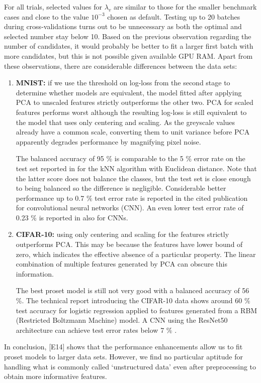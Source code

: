 %
For all trials, selected values for $\lambda_v$ are similar to those for the smaller benchmark cases and close to the value $10^{-3}$ chosen as default.
Testing up to 20 batches during cross-validations turns out to be unnecessary as both the optimal and selected number stay below 10.
Based on the previous observation regarding the number of candidates, it would probably be better to fit a larger first batch with more candidates, but this is not possible given available GPU RAM.
Apart from these observations, there are considerable differences between the data sets:
%
\begin{enumerate}
\item\textbf{MNIST:} if we use the threshold on log-loss from the second stage to determine whether models are equivalent, the model fitted after applying PCA to unscaled features strictly outperforms the other two.
PCA for scaled features performs worst although the resulting log-loss is still equivalent to the model that uses only centering and scaling.
As the greyscale values already have a common scale, converting them to unit variance before PCA apparently degrades performance by magnifying pixel noise.\par
%
The balanced accuracy of 95 \% is comparable to the 5 \% error rate on the test set reported in \cite{LeCun_98} for the kNN algorithm with Euclidean distance.
Note that the latter score does not balance the classes, but the test set is close enough to being balanced so the difference is negligible.
Considerable better performance up to 0.7 \% test error rate is reported in the cited publication for convolutional neural networks (CNN).
An even lower test error rate of 0.23 \% is reported in \cite{Ciresan_12} also for CNNs.
%
\item\textbf{CIFAR-10:} using only centering and scaling for the features strictly outperforms PCA.
This may be because the features have lower bound of zero, which indicates the effective absence of a particular property.
The linear combination of multiple features generated by PCA can obscure this information.\par
%
The best proset model is still not very good with a balanced accuracy of 56 \%.
The technical report \cite{Krizhevsky_09} introducing the CIFAR-10 data shows around 60 \% test accuracy for logistic regression applied to features generated from a RBM (Restricted Boltzmann Machine) model.
A CNN using the ResNet50 architecture can achieve test error rates below 7 \% \cite{He_15}.
\end{enumerate}
%
In conclusion, [E14] shows that the performance enhancements allow us to fit proset models to larger data sets.
However, we find no particular aptitude for handling what is commonly called `unstructured data' even after preprocessing to obtain more informative features.
%
\endinput
